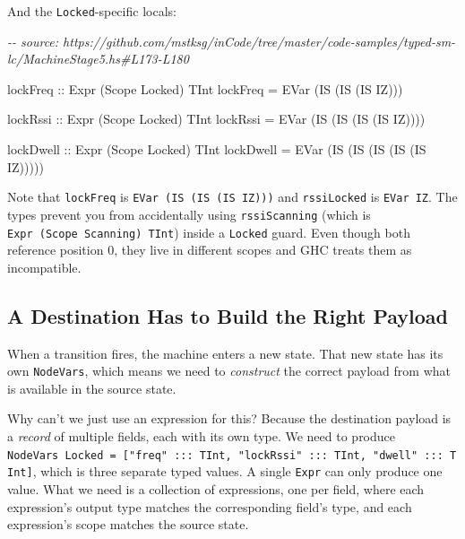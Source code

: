 \documentclass[]{article}
\newenvironment{Shaded}{}{}
\newcommand{\CommentTok}[1]{\textcolor[rgb]{0.38,0.63,0.69}{\textit{#1}}}
\newcommand{\DataTypeTok}[1]{\textcolor[rgb]{0.56,0.13,0.00}{#1}}
\newcommand{\NormalTok}[1]{#1}
\newcommand{\OtherTok}[1]{\textcolor[rgb]{0.00,0.44,0.13}{#1}}
\begin{document}
And the \texttt{Locked}-specific locals:

\begin{Shaded}
\begin{Highlighting}[]
\CommentTok{{-}{-} source: https://github.com/mstksg/inCode/tree/master/code{-}samples/typed{-}sm{-}lc/MachineStage5.hs\#L173{-}L180}

\OtherTok{lockFreq ::} \DataTypeTok{Expr}\NormalTok{ (}\DataTypeTok{Scope} \DataTypeTok{Locked}\NormalTok{) }\DataTypeTok{TInt}
\NormalTok{lockFreq }\OtherTok{=} \DataTypeTok{EVar}\NormalTok{ (}\DataTypeTok{IS}\NormalTok{ (}\DataTypeTok{IS}\NormalTok{ (}\DataTypeTok{IS} \DataTypeTok{IZ}\NormalTok{)))}

\OtherTok{lockRssi ::} \DataTypeTok{Expr}\NormalTok{ (}\DataTypeTok{Scope} \DataTypeTok{Locked}\NormalTok{) }\DataTypeTok{TInt}
\NormalTok{lockRssi }\OtherTok{=} \DataTypeTok{EVar}\NormalTok{ (}\DataTypeTok{IS}\NormalTok{ (}\DataTypeTok{IS}\NormalTok{ (}\DataTypeTok{IS}\NormalTok{ (}\DataTypeTok{IS} \DataTypeTok{IZ}\NormalTok{))))}

\OtherTok{lockDwell ::} \DataTypeTok{Expr}\NormalTok{ (}\DataTypeTok{Scope} \DataTypeTok{Locked}\NormalTok{) }\DataTypeTok{TInt}
\NormalTok{lockDwell }\OtherTok{=} \DataTypeTok{EVar}\NormalTok{ (}\DataTypeTok{IS}\NormalTok{ (}\DataTypeTok{IS}\NormalTok{ (}\DataTypeTok{IS}\NormalTok{ (}\DataTypeTok{IS}\NormalTok{ (}\DataTypeTok{IS} \DataTypeTok{IZ}\NormalTok{)))))}
\end{Highlighting}
\end{Shaded}

Note that \texttt{lockFreq} is \texttt{EVar\ (IS\ (IS\ (IS\ IZ)))} and
\texttt{rssiLocked} is \texttt{EVar\ IZ}. The types prevent you from
accidentally using \texttt{rssiScanning} (which is
\texttt{Expr\ (Scope\ Scanning)\ TInt}) inside a \texttt{Locked} guard. Even
though both reference position 0, they live in different scopes and GHC treats
them as incompatible.

\subsection{A Destination Has to Build the Right
Payload}\label{a-destination-has-to-build-the-right-payload}

When a transition fires, the machine enters a new state. That new state has its
own \texttt{NodeVars}, which means we need to \emph{construct} the correct
payload from what is available in the source state.

Why can't we just use an expression for this? Because the destination payload is
a \emph{record} of multiple fields, each with its own type. We need to produce
\texttt{NodeVars\ Locked\ =\ {[}"freq"\ :::\ TInt,\ "lockRssi"\ :::\ TInt,\ "dwell"\ :::\ TInt{]}},
which is three separate typed values. A single \texttt{Expr} can only produce
one value. What we need is a collection of expressions, one per field, where
each expression's output type matches the corresponding field's type, and each
expression's scope matches the source state.
\end{document}
